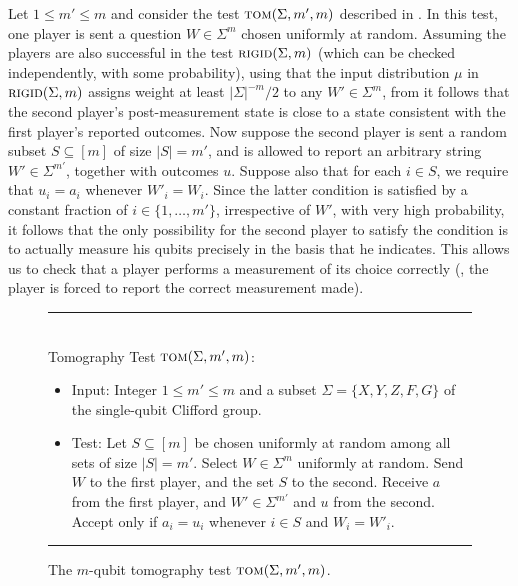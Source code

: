 \documentclass{toc}
\newcommand{\rigid}{\textsc{rigid}}
\newcommand{\tom}{\textsc{tom}}
\begin{document}
Let $1\leq m'\leq m$ and consider the test $\tom(\Sigma,m',m)$ described in . In this test, one player is sent a question $W\in\Sigma^{m}$ chosen uniformly at random. Assuming the players are also successful in the test $\rigid(\Sigma,m)$ (which can be checked independently, with some probability), using that the input distribution $\mu$ in $\rigid(\Sigma,m)$ assigns weight at least $|\Sigma|^{-m}/2$ to any $W'\in \Sigma^{m}$, from  it follows that the second player's post-measurement state is close to a state consistent with the first player's reported outcomes. Now suppose the second player is sent a random subset $S\subseteq [m]$ of size $|S|=m'$, and is allowed to report an arbitrary string $W'\in \Sigma^{m'}$, together with outcomes $u$. Suppose also that for each $i\in S$, we require that $u_i=a_i$ whenever $W'_i=W_i$. Since the latter condition is satisfied by a constant fraction of $i\in\{1,\ldots,m'\}$, irrespective of $W'$, with very high probability, it follows that the only possibility for the second player to satisfy the condition is to actually measure his qubits precisely in the basis that he indicates. This allows us to check that a player performs a measurement of its choice correctly (\ie, the player is forced to report the correct measurement made).

\begin{figure}[H]
\rule[1ex]{\textwidth}{0.5pt}\\
Tomography Test $\tom(\Sigma,m',m)$: 
\begin{itemize}
    \item Input: Integer $1\leq m'\leq m$ and a subset $\Sigma = \{X,Y,Z,F,G\}$ of the single-qubit Clifford group. 
    \item Test: Let $S\subseteq [m]$ be chosen uniformly at random among all sets of size $|S|=m'$. Select $W\in\Sigma^{m}$ uniformly at random. Send $W$ to the first player, and the set $S$ to the second. Receive $a$ from the first player, and $W'\in\Sigma^{m'}$ and $u$ from the second. Accept only if $a_i=u_i$ whenever $i\in S$ and $W_i=W'_i$. 
\end{itemize}
\rule[2ex]{\textwidth}{0.5pt}\vspace{-.5cm}
\caption{The $m$-qubit tomography test $\tom(\Sigma,m',m)$.}
\label{fig:tomography-test}
\end{figure} 
\end{document}
